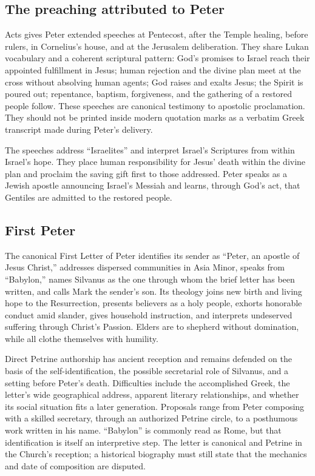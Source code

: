 \subsection{The preaching attributed to Peter}

Acts gives Peter extended speeches at Pentecost, after the Temple healing,
before rulers, in Cornelius's house, and at the Jerusalem deliberation. They
share Lukan vocabulary and a coherent scriptural pattern: God's promises to
Israel reach their appointed fulfillment in Jesus; human rejection and the
divine plan meet at the cross without absolving human agents; God raises and
exalts Jesus; the Spirit is poured out; repentance, baptism, forgiveness, and
the gathering of a restored people follow. These speeches are canonical
testimony to apostolic proclamation. They should not be printed inside modern
quotation marks as a verbatim Greek transcript made during Peter's delivery.

The speeches address ``Israelites'' and interpret Israel's Scriptures from
within Israel's hope. They place human responsibility for Jesus' death within
the divine plan and proclaim the saving gift first to those addressed. Peter
speaks as a Jewish apostle announcing Israel's Messiah and learns, through
God's act, that Gentiles are admitted to the restored people.

\subsection{First Peter}

The canonical First Letter of Peter identifies its sender as ``Peter, an
apostle of Jesus Christ,'' addresses dispersed communities in Asia Minor,
speaks from ``Babylon,'' names Silvanus as the one through whom the brief
letter has been written, and calls Mark the sender's son. Its theology joins
new birth and living hope to the Resurrection, presents believers as a holy
people, exhorts honorable conduct amid slander, gives household instruction,
and interprets undeserved suffering through Christ's Passion. Elders are to
shepherd without domination, while all clothe themselves with humility.

Direct Petrine authorship has ancient reception and remains defended on the
basis of the self-identification, the possible secretarial role of Silvanus,
and a setting before Peter's death. Difficulties include the accomplished
Greek, the letter's wide geographical address, apparent literary
relationships, and whether its social situation fits a later generation.
Proposals range from Peter composing with a skilled secretary, through an
authorized Petrine circle, to a posthumous work written in his name. ``Babylon''
is commonly read as Rome, but that identification is itself an interpretive
step. The letter is canonical and Petrine in the Church's reception; a
historical biography must still state that the mechanics and date of
composition are disputed.

